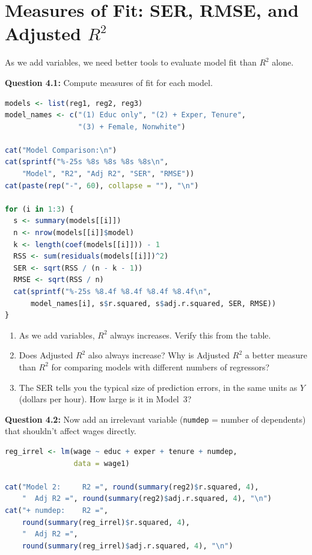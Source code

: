 \documentclass[11pt,letterpaper]{article}
\begin{document}
\vspace{3cm}

\newpage

\section{Measures of Fit: SER, RMSE, and Adjusted $R^2$}

As we add variables, we need better tools to evaluate model fit than $R^2$ alone.

\textbf{Question 4.1:} Compute measures of fit for each model.

\begin{lstlisting}[language=R]
models <- list(reg1, reg2, reg3)
model_names <- c("(1) Educ only", "(2) + Exper, Tenure",
                 "(3) + Female, Nonwhite")

cat("Model Comparison:\n")
cat(sprintf("%-25s %8s %8s %8s %8s\n",
    "Model", "R2", "Adj R2", "SER", "RMSE"))
cat(paste(rep("-", 60), collapse = ""), "\n")

for (i in 1:3) {
  s <- summary(models[[i]])
  n <- nrow(models[[i]]$model)
  k <- length(coef(models[[i]])) - 1
  RSS <- sum(residuals(models[[i]])^2)
  SER <- sqrt(RSS / (n - k - 1))
  RMSE <- sqrt(RSS / n)
  cat(sprintf("%-25s %8.4f %8.4f %8.4f %8.4f\n",
      model_names[i], s$r.squared, s$adj.r.squared, SER, RMSE))
}
\end{lstlisting}

\begin{enumerate}[label=(\alph*)]
\item As we add variables, $R^2$ always increases. Verify this from the table.
\item Does Adjusted $R^2$ also always increase? Why is Adjusted $R^2$ a better measure than $R^2$ for comparing models with different numbers of regressors?
\item The SER tells you the typical size of prediction errors, in the same units as $Y$ (dollars per hour). How large is it in Model~3?
\end{enumerate}

\vspace{3cm}

\textbf{Question 4.2:} Now add an irrelevant variable (\texttt{numdep} = number of dependents) that shouldn't affect wages directly.

\begin{lstlisting}[language=R]
reg_irrel <- lm(wage ~ educ + exper + tenure + numdep,
                data = wage1)

cat("Model 2:     R2 =", round(summary(reg2)$r.squared, 4),
    "  Adj R2 =", round(summary(reg2)$adj.r.squared, 4), "\n")
cat("+ numdep:    R2 =",
    round(summary(reg_irrel)$r.squared, 4),
    "  Adj R2 =",
    round(summary(reg_irrel)$adj.r.squared, 4), "\n")
\end{lstlisting}
\end{document}

